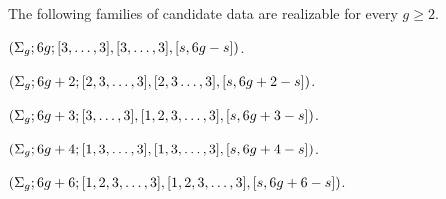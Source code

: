 \begin{proposition}\label{dessins:th:special-families}
The following families of candidate data are realizable for every $g\ge 2$.
\begin{enumarabic}
\item $(\Sigma_{g};6g;[3,\ldots,3],[3,\ldots,3],[s,6g-s])$.
\item $(\Sigma_{g};6g+2;[2,3,\ldots,3],[2,3\ldots,3],[s,6g+2-s])$.
\item $(\Sigma_{g};6g+3;[3,\ldots,3],[1,2,3,\ldots,3],[s,6g+3-s])$.
\item $(\Sigma_{g};6g+4;[1,3,\ldots,3],[1,3,\ldots,3],[s,6g+4-s])$.
\item $(\Sigma_{g};6g+6;[1,2,3,\ldots,3],[1,2,3,\ldots,3],[s,6g+6-s])$.
\end{enumarabic}
\end{proposition}
